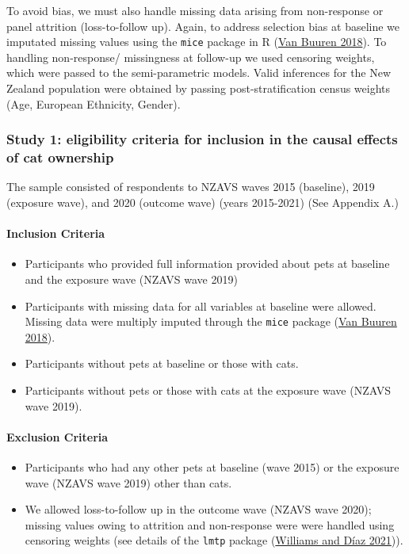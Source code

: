 \documentclass[
  singlecolumn,
  9pt]{article}
\let\oldparagraph\paragraph
\renewcommand{\paragraph}[1]{\oldparagraph{#1}\mbox{}}
\providecommand{\tightlist}{%
  \setlength{\itemsep}{0pt}\setlength{\parskip}{0pt}}\usepackage{longtable,booktabs,array}
\begin{document}
To avoid bias, we must also handle missing data arising from
non-response or panel attrition (loss-to-follow up). Again, to address
selection bias at baseline we imputated missing values using the
\texttt{mice} package in R (\hyperref[ref-vanbuuren2018]{Van Buuren
2018}). To handling non-response/ missingness at follow-up we used
censoring weights, which were passed to the semi-parametric models.
Valid inferences for the New Zealand population were obtained by passing
post-stratification census weights (Age, European Ethnicity, Gender).

\subsubsection{Study 1: eligibility criteria for inclusion in the causal
effects of cat
ownership}\label{study-1-eligibility-criteria-for-inclusion-in-the-causal-effects-of-cat-ownership}

The sample consisted of respondents to NZAVS waves 2015 (baseline), 2019
(exposure wave), and 2020 (outcome wave) (years 2015-2021) (See Appendix
A.)

\paragraph{Inclusion Criteria}\label{inclusion-criteria}

\begin{itemize}
\tightlist
\item
  Participants who provided full information provided about pets at
  baseline and the exposure wave (NZAVS wave 2019)
\item
  Participants with missing data for all variables at baseline were
  allowed. Missing data were multiply imputed through the \texttt{mice}
  package (\hyperref[ref-vanbuuren2018]{Van Buuren 2018}).
\item
  Participants without pets at baseline or those with cats.
\item
  Participants without pets or those with cats at the exposure wave
  (NZAVS wave 2019).
\end{itemize}

\paragraph{Exclusion Criteria}\label{exclusion-criteria}

\begin{itemize}
\tightlist
\item
  Participants who had any other pets at baseline (wave 2015) or the
  exposure wave (NZAVS wave 2019) other than cats.
\item
  We allowed loss-to-follow up in the outcome wave (NZAVS wave 2020);
  missing values owing to attrition and non-response were were handled
  using censoring weights (see details of the \texttt{lmtp} package
  (\hyperref[ref-williams2021]{Williams and Díaz 2021})).
\end{itemize}
\end{document}
